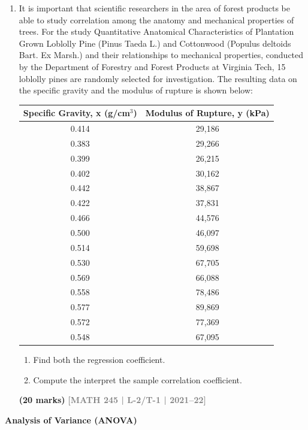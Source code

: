 \documentclass[12pt,a4paper]{article}
\newcommand{\yr}[1]{\hfill\textcolor{gray}{\small\textbf{[#1]}}}
\newcommand{\mk}[1]{\textcolor{orange!70!black}{\small\textbf{(#1 marks)}}}
\newcommand{\subtopic}[2]{%
  \vspace{10pt}
  \noindent\begin{tcolorbox}[colback=#1!8,colframe=#1,boxrule=0.6pt,arc=4pt,
    left=6pt,right=6pt,top=4pt,bottom=4pt]
    \small\bfseries\textcolor{#1}{#2}
  \end{tcolorbox}
  \vspace{2pt}
}
\begin{document}
\begin{enumerate}
\item It is important that scientific researchers in the area of forest products be able to study correlation among the anatomy and mechanical properties of trees. For the study Quantitative Anatomical Characteristics of Plantation Grown Loblolly Pine (Pinus Taeda L.) and Cottonwood (Populus deltoids Bart. Ex Marsh.) and their relationships to mechanical properties, conducted by the Department of Forestry and Forest Products at Virginia Tech, 15 loblolly pines are randomly selected for investigation. The resulting data on the specific gravity and the modulus of rupture is shown below:
\begin{center}
  \begin{tabular}{|c|c|}
\hline
Specific Gravity, x (g/cm$^3$) & Modulus of Rupture, y (kPa) \\ \hline
0.414 & 29,186 \\ \hline
0.383 & 29,266 \\ \hline
0.399 & 26,215 \\ \hline
0.402 & 30,162 \\ \hline
0.442 & 38,867 \\ \hline
0.422 & 37,831 \\ \hline
0.466 & 44,576 \\ \hline
0.500 & 46,097 \\ \hline
0.514 & 59,698 \\ \hline
0.530 & 67,705 \\ \hline
0.569 & 66,088 \\ \hline
0.558 & 78,486 \\ \hline
0.577 & 89,869 \\ \hline
0.572 & 77,369 \\ \hline
0.548 & 67,095 \\ \hline
\end{tabular}
\end{center}

\begin{enumerate}
  \item Find both the regression coefficient.
  \item Compute the interpret the sample correlation coefficient.
\end{enumerate}
\mk{20} \yr{MATH 245 | L-2/T-1 | 2021--22}

\end{enumerate}

\subtopic{cG}{Analysis of Variance (ANOVA)}
\label{sub:s9-anova}
\end{document}
